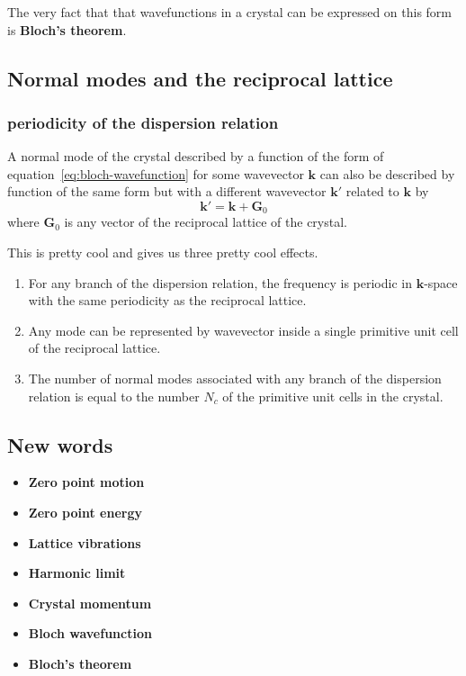 \documentclass[11pt]{article}
\begin{document}
The very fact that that wavefunctions in a crystal can be expressed on this form is \textbf{Bloch's theorem}.
	
\subsection{Normal modes and the reciprocal lattice}
\subsubsection{periodicity of the dispersion relation}\label{sec:dispersion}
A normal mode of the crystal described by a function of the form of equation~\ref{eq:bloch-wavefunction} for some wavevector $\pmb{k}$ can also be described by function of the same form but with a different wavevector $\pmb{k}'$ related to $\pmb{k}$ by
\begin{equation}
	\pmb{k}' = \pmb{k} + \pmb{G}_0
\end{equation}
where $\pmb{G}_0$ is any vector of the reciprocal lattice of the crystal.

This is pretty cool and gives us three pretty cool effects.
\begin{enumerate}
	\item For any branch of the dispersion relation, the frequency is periodic in $\pmb{k}$-space with the same periodicity as the reciprocal lattice.
	\item Any mode can be represented by wavevector inside a single primitive unit cell of the reciprocal lattice.
	\item The number of normal modes associated with any branch of the dispersion relation is equal to the number $N_c$ of the primitive unit cells in the crystal.
\end{enumerate}
\newpage
\subsection{New words}
\begin{itemize}
	\item \textbf{Zero point motion}
	\item \textbf{Zero point energy}
	\item \textbf{Lattice vibrations}
	\item \textbf{Harmonic limit}
	\item \textbf{Crystal momentum}
	\item \textbf{Bloch wavefunction}
	\item \textbf{Bloch's theorem}
\end{itemize}
\newpage
\end{document}
